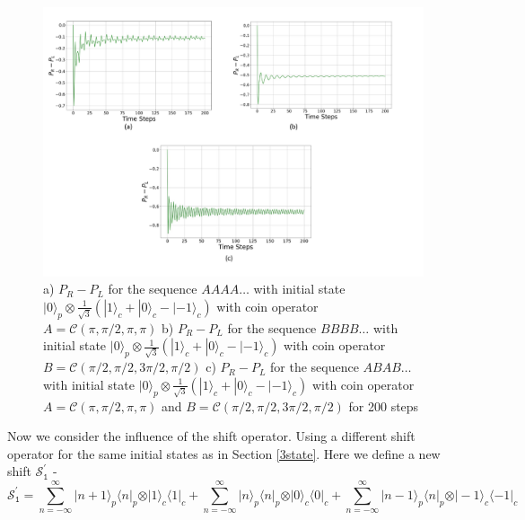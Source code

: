 \documentclass[english,aps,pra,amsmath,amssymb,showpacs,notitlepage,onecolumn]{revtex4-1}
\begin{document}
\begin{figure}[h]
\includegraphics[scale=0.6]{3state_diff_initial.pdf}

 \caption{a) $P_R -P_L$ for the sequence $AAAA\ldots$ with initial state $| 0 \rangle_p \otimes \frac{1}{\sqrt{3}}(| 1 \rangle_c + | 0 \rangle_c - | -1 \rangle_c)$ with coin operator $A = \mathcal{C}(\pi, \pi/2, \pi, \pi)$  b) $P_R -P_L$ for the sequence $BBBB\ldots$ with initial state $| 0 \rangle_p \otimes \frac{1}{\sqrt{3}}(| 1 \rangle_c + | 0 \rangle_c - | -1 \rangle_c)$ with coin operator $B = \mathcal{C}(\pi/2, \pi/2, 3\pi/2, \pi/2)$ c) $P_R -P_L$ for the sequence $ABAB\ldots$ with initial state $| 0 \rangle_p \otimes \frac{1}{\sqrt{3}}(| 1 \rangle_c + | 0 \rangle_c - | -1 \rangle_c)$ with coin operator $A = \mathcal{C}(\pi, \pi/2, \pi, \pi)$ and $B = \mathcal{C}(\pi/2, \pi/2, 3\pi/2, \pi/2)$ for 200 steps}\label{initial_state}
\end{figure}
Now we consider the influence of the shift operator. Using a different shift operator for the same initial states as in Section \ref{3state}. Here we define a new shift $\mathcal{S^{\prime}_\texttt{1}}$ -
\begin{equation}\label{new_shift}
\mathcal{S^{\prime}_\texttt{1}} =   \sum\limits_{n=-\infty}^{\infty}\vert n+1 \rangle_p \langle n \vert_p \otimes \vert  1\rangle_c \langle 1 \vert_c +   \sum\limits_{n=-\infty}^{\infty}\vert n \rangle_p \langle n \vert_p \otimes \vert 0 \rangle_c \langle 0 \vert_c +   \sum\limits_{n=-\infty}^{\infty}\vert n-1 \rangle_p \langle n \vert_p \otimes \vert -1 \rangle_c \langle -1 \vert_c
\end{equation}
\end{document}
